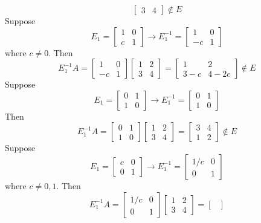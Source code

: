 \documentclass[openany]{book}
\begin{document}
\begin{description}
$$\begin{bmatrix}
3 & 4
\end{bmatrix} \not \in E$$
Suppose
$$E_1 = \begin{bmatrix}
1 & 0 \\
c & 1
\end{bmatrix} \rightarrow E_1^{-1} = \begin{bmatrix}
1 & 0 \\
-c & 1
\end{bmatrix}$$
where $c \neq 0$. Then
$$E_1^{-1}A = \begin{bmatrix}
1 & 0 \\
-c & 1
\end{bmatrix}\begin{bmatrix}
1 & 2 \\
3 & 4
\end{bmatrix} = \begin{bmatrix}
1 & 2 \\
3 - c & 4 - 2c
\end{bmatrix} \not \in E$$
Suppose
$$E_1 = \begin{bmatrix}
0 & 1 \\
1 & 0
\end{bmatrix} \rightarrow E_1^{-1} = \begin{bmatrix}
0 & 1 \\
1 & 0
\end{bmatrix}$$
Then
$$E_1^{-1}A = \begin{bmatrix}
0 & 1 \\
1 & 0
\end{bmatrix}\begin{bmatrix}
1 & 2 \\
3 & 4
\end{bmatrix} = \begin{bmatrix}
3 & 4 \\
1 & 2
\end{bmatrix} \not \in E$$
Suppose
$$E_1 = \begin{bmatrix}
c & 0 \\
0 & 1
\end{bmatrix} \rightarrow E_1^{-1} = \begin{bmatrix}
1/c & 0 \\
0 & 1
\end{bmatrix}$$
where $c \neq 0, 1$. Then
$$E_1^{-1}A = \begin{bmatrix}
1/c & 0 \\
0 & 1
\end{bmatrix}\begin{bmatrix}
1 & 2 \\
3 & 4
\end{bmatrix} = \begin{bmatrix}

\end{bmatrix}$$
\end{description}
\end{document}
